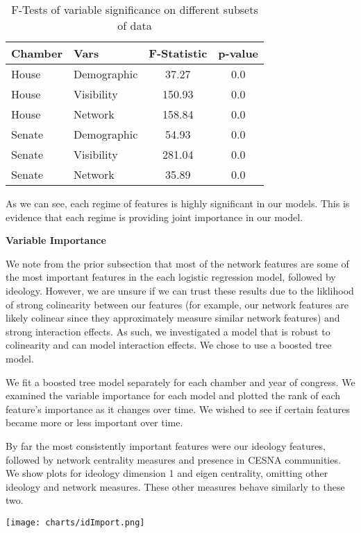 \begin{table}
\centering
   \begin{tabular}{llcc}
   \toprule
   Chamber & Vars & F-Statistic & p-value \\ \midrule
   House & Demographic & 37.27 & 0.0 \\
   House & Visibility & 150.93 & 0.0 \\
   House & Network & 158.84 & 0.0 \\
   Senate & Demographic & 54.93 & 0.0 \\
   Senate & Visibility & 281.04 & 0.0 \\ 
   Senate & Network & 35.89 & 0.0 \\ \bottomrule
   \end{tabular}
   \caption{F-Tests of variable significance on different subsets of data}
   \label{table:perf}
\end{table}

As we can see, each regime of features is highly significant in our models. This
is evidence that each regime is providing joint importance in our model.

\textbf{Variable Importance}

We note from the prior subsection that most of the network features are some of
the most important features in the each logistic regression model, followed by
ideology. However, we are unsure if we can trust these results due to the
liklihood of strong colinearity between our features (for example, our network
features are likely colinear since they approximately measure similar network
features) and strong interaction effects. As such, we investigated a model that
is robust to colinearity and can model interaction effects. We chose to use a
boosted tree model.

We fit a boosted tree model separately for each chamber and year of congress. We
examined the variable importance for each model and plotted the rank of each
feature's importance as it changes over time. We wished to see if certain
features became more or less important over time.

By far the most consistently important features were our ideology features,
followed by network centrality measures and presence in CESNA communities. We
show plots for ideology dimension 1 and eigen centrality, omitting other
ideology and network measures. These other measures behave similarly to these
two.

\texttt{[image: charts/idImport.png]}

